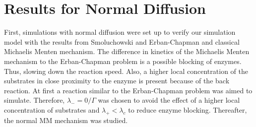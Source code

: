 \documentclass[
  a4paper,BCOR10mm,oneside,
  headsepline,footsepline,%
  fleqn,openbib
]{scrbook}
\begin{document}
\section{Results for Normal Diffusion}
First, simulations with normal diffusion were set up to verify our simulation model  with the results from Smoluchowski \cite{vonSmoluchowski1906} and Erban-Chapman \cite{Erban2009} and classical Michaelis Menten mechanism. The difference in kinetics of the Michaelis Menten mechanism to the Erban-Chapman problem is a possible blocking of enzymes. Thus, slowing down the reaction speed. Also, a higher local concentration of the substrates in close proximity to the enzyme  is present because of the back reaction. At first a reaction similar to the Erban-Chapman problem was aimed to simulate. Therefore,  $\lambda_-=0 /\Gamma$  was chosen to avoid the effect of a higher local concentration of substrates and $\lambda_+ < \lambda_c$ to reduce enzyme blocking. Thereafter, the normal MM mechanism was studied. 
\end{document}
